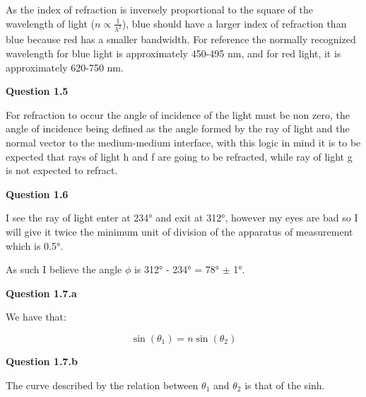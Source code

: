 \documentclass[a4paper,12pt]{article}
\begin{document}
As the index of refraction is inversely proportional to the square of the wavelength of light ($n \propto \frac{1}{\lambda^2}$), blue should have a larger index of refraction than blue because red has a smaller bandwidth. For reference the normally recognized wavelength for blue light is approximately 450-495 nm, and for red light, it is approximately 620-750 nm.

\vspace{0.2cm}

\noindent \textbf{\LARGE Question 1.5}

\vspace{0.2cm}

For refraction to occur the angle of incidence of the light must be non zero, the angle of incidence being defined as the angle formed by the ray of light and the normal vector to the medium-medium interface, with this logic in mind it is to be expected that rays of light h and f are going to be refracted, while ray of light g is not expected to refract.

\vspace{0.2cm}

\noindent \textbf{\LARGE Question 1.6}

\vspace{0.2cm}

I see the ray of light enter at 234° and exit at 312°, however my eyes are bad so I will give it twice the minimum unit of division of the apparatus of measurement which is 0.5°.

\vspace{0.1cm}

As such I believe the angle $\phi$ is 312° - 234° = 78° $\pm$ 1°.

\vspace{3cm}

\noindent \textbf{\LARGE Question 1.7.a}

\vspace{0.2cm}

We have that:

\begin{equation}
    \sin(\theta_1) = n \sin(\theta_2)
\end{equation}

\vspace{0.2cm}

\noindent \textbf{\LARGE Question 1.7.b}

\vspace{0.2cm}

The curve described by the relation between $\theta_1$ and $\theta_2$ is that of the sinh.
\end{document}
